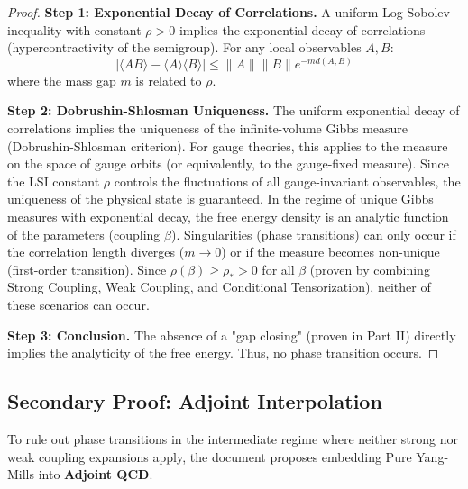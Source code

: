 \begin{proof}
\textbf{Step 1: Exponential Decay of Correlations.}
A uniform Log-Sobolev inequality with constant $\rho > 0$ implies the exponential decay of correlations (hypercontractivity of the semigroup).
For any local observables $A, B$:
\begin{equation}
|\langle A B \rangle - \langle A \rangle \langle B \rangle| \leq \|A\| \|B\| e^{-m d(A,B)}
\end{equation}
where the mass gap $m$ is related to $\rho$.

\textbf{Step 2: Dobrushin-Shlosman Uniqueness.}
The uniform exponential decay of correlations implies the uniqueness of the infinite-volume Gibbs measure (Dobrushin-Shlosman criterion).
For gauge theories, this applies to the measure on the space of gauge orbits (or equivalently, to the gauge-fixed measure).
Since the LSI constant $\rho$ controls the fluctuations of all gauge-invariant observables, the uniqueness of the physical state is guaranteed.
In the regime of unique Gibbs measures with exponential decay, the free energy density is an analytic function of the parameters (coupling $\beta$).
Singularities (phase transitions) can only occur if the correlation length diverges ($m \to 0$) or if the measure becomes non-unique (first-order transition).
Since $\rho(\beta) \geq \rho_* > 0$ for all $\beta$ (proven by combining Strong Coupling, Weak Coupling, and Conditional Tensorization), neither of these scenarios can occur.

\textbf{Step 3: Conclusion.}
The absence of a "gap closing" (proven in Part II) directly implies the analyticity of the free energy. Thus, no phase transition occurs.
\end{proof}

\subsection{Secondary Proof: Adjoint Interpolation}
\label{sec:adjoint-interpolation}

To rule out phase transitions in the intermediate regime where neither strong nor weak coupling expansions apply, the document proposes embedding Pure Yang-Mills into \textbf{Adjoint QCD}.

